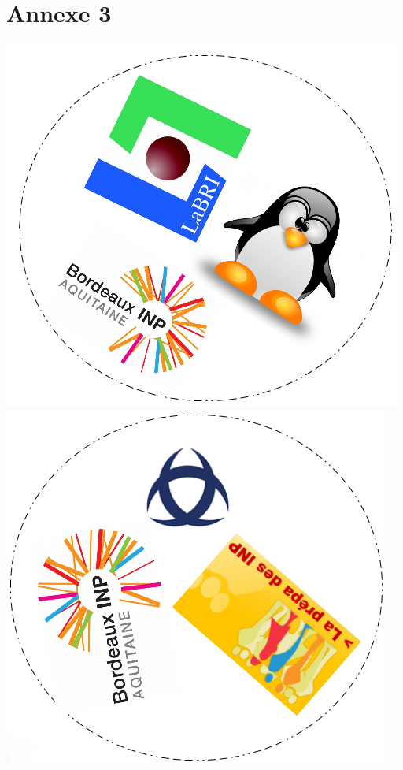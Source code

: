 \documentclass[a4paper]{article}
\begin{document}
\section*{Annexe 3}
\includegraphics[scale=0.43]{dobble1.png}
\includegraphics[scale=0.43]{dobble2.png}\\
\end{document}
